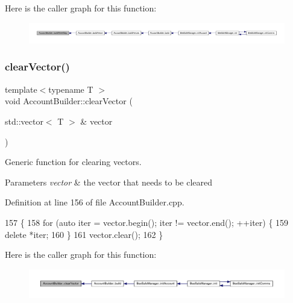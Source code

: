 Here is the caller graph for this function\+:\nopagebreak
\begin{figure}[H]
\begin{center}
\leavevmode
\includegraphics[width=350pt]{d9/daa/class_account_builder_a19b2e3e2c3bbf986f51c0ec53b7dc2a4_icgraph}
\end{center}
\end{figure}
\mbox{\label{class_account_builder_aad3332b566e26b4b92215bf6500b26b6}} 
\subsubsection{\texorpdfstring{clear\+Vector()}{clearVector()}}
{\footnotesize\ttfamily template$<$typename T $>$ \\
void Account\+Builder\+::clear\+Vector (\begin{DoxyParamCaption}\item[{std\+::vector$<$ T $>$ \&}]{vector }\end{DoxyParamCaption})\hspace{0.3cm}{\ttfamily [private]}}

Generic function for clearing vectors.


\begin{DoxyParams}{Parameters}
{\em vector} & the vector that needs to be cleared \\
\hline
\end{DoxyParams}


Definition at line 156 of file Account\+Builder.\+cpp.


\begin{DoxyCode}
157 \{
158     \textcolor{keywordflow}{for} (\textcolor{keyword}{auto} iter = vector.begin(); iter != vector.end(); ++iter) \{
159         \textcolor{keyword}{delete} *iter;
160     \}
161     vector.clear();
162 \}
\end{DoxyCode}
Here is the caller graph for this function\+:\nopagebreak
\begin{figure}[H]
\begin{center}
\leavevmode
\includegraphics[width=350pt]{d9/daa/class_account_builder_aad3332b566e26b4b92215bf6500b26b6_icgraph}
\end{center}
\end{figure}
\mbox{\label{class_account_builder_a6161184b277a8055ccab47411b14d195}} 
